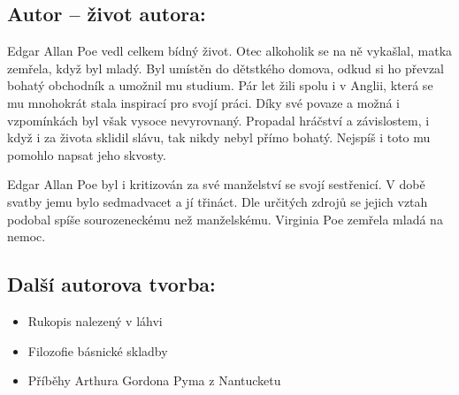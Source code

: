 \documentclass[A4paper]{extarticle} %
\begin{document}



\subsection*{Autor {\ssmall -- život autora:}}
\noindent 
Edgar Allan Poe vedl celkem bídný život. Otec alkoholik se na ně vykašlal, matka zemřela, když byl mladý. Byl umístěn do dětstkého domova, odkud si ho převzal bohatý obchodník a umožnil mu studium. Pár let žili spolu i v Anglii, která se mu mnohokrát stala inspirací pro svojí práci. Díky své povaze a možná i vzpomínkách byl však vysoce nevyrovnaný. Propadal hráčství a závislostem, i když i za života sklidil slávu, tak nikdy nebyl přímo bohatý. Nejspíš i toto mu pomohlo napsat jeho skvosty.

Edgar Allan Poe byl i kritizován za své manželství se svojí sestřenicí. V době svatby jemu bylo sedmadvacet a jí třináct. Dle určitých zdrojů se jejich vztah podobal spíše sourozeneckému než manželskému. Virginia Poe zemřela mladá na nemoc.


\subsection*{Další autorova tvorba:}
\noindent 
\begin{itemize}
    \item Rukopis nalezený v láhvi
    \item Filozofie básnické skladby
    \item Příběhy Arthura Gordona Pyma z Nantucketu
    
\end{itemize}
\end{document}
